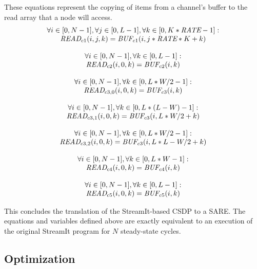 These equations represent the copying of items from a channel's buffer
to the read array that a node will access.
{\scriptsize
\begin{equation*}
\begin{array}{c}
\forall i \in [0,N-1], \forall j \in [0, L-1], \forall k \in [0,K*\mbox{\it RATE}-1]: \\ \mbox{\it READ}_{c1}(i,j,k) = \mbox{\it BUF}_{c1}(i,j*\mbox{\it RATE}*K+k) \\ ~ \\
\forall i \in [0, N-1], \forall k \in [0, L-1]: \\ {\mbox{\it READ}_{c2}}(i,0,k) = \mbox{\it BUF}_{c2}(i,k) \\ ~ \\
\forall i \in [0, N-1], \forall k \in [0, L*W/2-1]: \\ {\mbox{\it READ}_{c3, 0}}(i,0,k) =  \mbox{\it BUF}_{c3}(i,k) \\ ~ \\
\forall i \in [0, N-1], \forall k \in [0, L*(L-W)-1]: \\ {\mbox{\it READ}_{c3, 1}}(i,0,k) = \mbox{\it BUF}_{c3}(i,L*W/2 + k) \\ ~ \\
\forall i \in [0, N-1], \forall k \in [0, L*W/2-1]: \\ {\mbox{\it READ}_{c3, 2}}(i,0,k) = \mbox{\it BUF}_{c3}(i,L*L-W/2 + k) \\ ~ \\
\forall i \in [0, N-1], \forall k \in [0, L*W-1]: \\ {\mbox{\it READ}_{c4}}(i,0,k) = \mbox{\it BUF}_{c4}(i,k)\\ ~ \\
\forall i \in [0, N-1], \forall k \in [0, L-1]: \\ {\mbox{\it READ}_{c5}}(i,0,k) = \mbox{\it BUF}_{c5}(i,k)
\end{array}
\end{equation*}}

This concludes the translation of the StreamIt-based CSDP to a SARE.
The equations and variables defined above are exactly equivalent to an
execution of the original StreamIt program for $N$ steady-state
cycles.

\subsection{Optimization}


